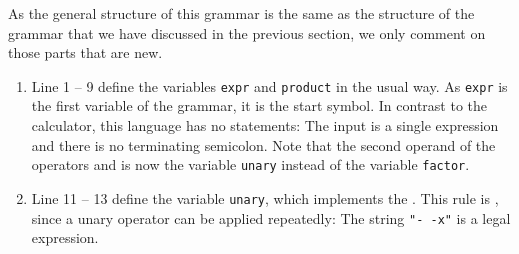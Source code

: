 \noindent
As the general structure of this grammar is the same as the structure of the grammar that we have
discussed in the previous section, we only comment on those parts that are new.
\begin{enumerate}
\item Line 1 -- 9 define the variables \texttt{expr} and \texttt{product} in the usual way.  As
      \texttt{expr} is the first variable of the grammar, it is the start symbol.  In contrast to the
      calculator, this language has no statements:  The input is a single expression and there is no
      terminating semicolon.  Note that the second operand of the operators \squoted{*} and \squoted{/} is
      now the variable \texttt{unary} instead of the variable \texttt{factor}.
\item Line 11 -- 13 define the variable \texttt{unary}, which implements the .  This rule
      is , since a unary operator can be applied repeatedly:  The string
      \texttt{"-\,-x"} is a legal expression.


\end{enumerate}
